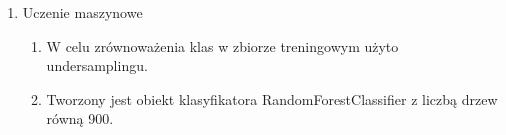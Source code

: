 \documentclass{article}
\begin{document}
\begin{enumerate}
\begin{enumerate}
                    \newpage
                    \item Uczenie maszynowe
                    \begin{enumerate}
                        \item W celu zrównoważenia klas w zbiorze treningowym użyto undersamplingu.
                        \item Tworzony jest obiekt klasyfikatora RandomForestClassifier z liczbą drzew równą 900.
                    \end{enumerate}
          \end{enumerate}
\end{enumerate}
\end{document}
